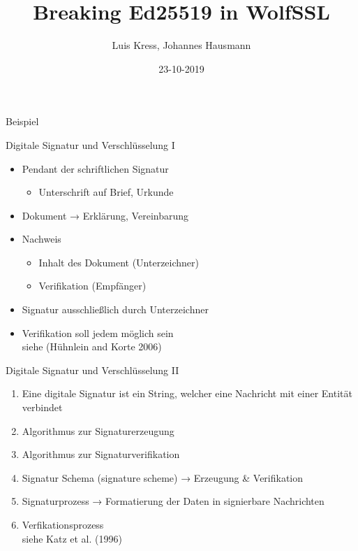 \documentclass[
  9pt,
  ignorenonframetext,
  aspectratio=169,
]{beamer}
\title{Breaking Ed25519 in WolfSSL}
\author{Luis Kress, Johannes Hausmann}
\date{23-10-2019}
\institute{Technische Hochschule Bingen}
\providecommand{\tightlist}{%
  \setlength{\itemsep}{0pt}\setlength{\parskip}{0pt}}
\begin{document}
\frame{\titlepage}

\begin{frame}
  \tableofcontents[hideallsubsections]
\end{frame}
\begin{frame}{Beispiel}
\protect\hypertarget{beispiel}{}
\end{frame}

\begin{frame}{Digitale Signatur und Verschlüsselung I}
\protect\hypertarget{digitale-signatur-und-verschluxfcsselung-i}{}
\begin{itemize}
\tightlist
\item
  Pendant der schriftlichen Signatur

  \begin{itemize}
  \tightlist
  \item
    Unterschrift auf Brief, Urkunde
  \end{itemize}
\item
  Dokument → Erklärung, Vereinbarung
\item
  Nachweis

  \begin{itemize}
  \tightlist
  \item
    Inhalt des Dokument (Unterzeichner)
  \item
    Verifikation (Empfänger)
  \end{itemize}
\item
  Signatur ausschließlich durch Unterzeichner
\item
  Verifikation soll jedem möglich sein\\
  siehe (Hühnlein and Korte 2006)
\end{itemize}
\end{frame}

\begin{frame}{Digitale Signatur und Verschlüsselung II}
\protect\hypertarget{digitale-signatur-und-verschluxfcsselung-ii}{}
\begin{enumerate}
\tightlist
\item
  Eine digitale Signatur ist ein String, welcher eine Nachricht mit
  einer Entität verbindet
\item
  Algorithmus zur Signaturerzeugung\\
\item
  Algorithmus zur Signaturverifikation
\item
  Signatur Schema (signature scheme) → Erzeugung \& Verifikation
\item
  Signaturprozess → Formatierung der Daten in signierbare Nachrichten
\item
  Verfikationsprozess\\
  siehe Katz et al. (1996)
\end{enumerate}
\end{frame}
\end{document}

